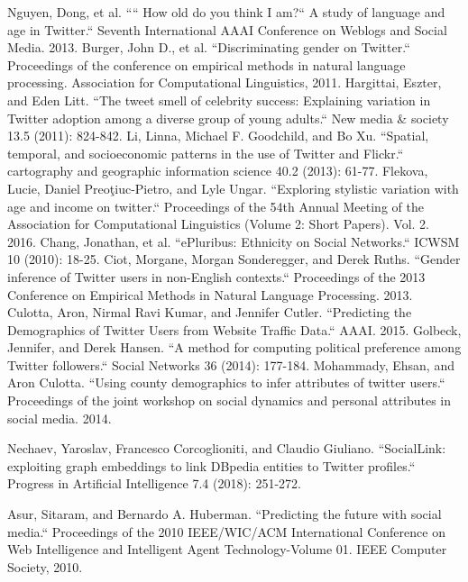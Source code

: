 \begin{thebibliography}{200}
 Nguyen, Dong, et al. ```` How old do you think I am?`` A study of language and age in Twitter.`` Seventh International AAAI Conference on Weblogs and Social Media. 2013.\label{appendix:4.2}
 Burger, John D., et al. ``Discriminating gender on Twitter.`` Proceedings of the conference on empirical methods in natural language processing. Association for Computational Linguistics, 2011.\label{appendix:4.3}
 Hargittai, Eszter, and Eden Litt. ``The tweet smell of celebrity success: Explaining variation in Twitter adoption among a diverse group of young adults.`` New media \& society 13.5 (2011): 824-842.\label{appendix:4.4}
 Li, Linna, Michael F. Goodchild, and Bo Xu. ``Spatial, temporal, and socioeconomic patterns in the use of Twitter and Flickr.`` cartography and geographic information science 40.2 (2013): 61-77.\label{appendix:4.5}
 Flekova, Lucie, Daniel Preoţiuc-Pietro, and Lyle Ungar. ``Exploring stylistic variation with age and income on twitter.`` Proceedings of the 54th Annual Meeting of the Association for Computational Linguistics (Volume 2: Short Papers). Vol. 2. 2016.\label{appendix:4.6}
 Chang, Jonathan, et al. ``ePluribus: Ethnicity on Social Networks.`` ICWSM 10 (2010): 18-25.\label{appendix:4.7}
 Ciot, Morgane, Morgan Sonderegger, and Derek Ruths. ``Gender inference of Twitter users in non-English contexts.`` Proceedings of the 2013 Conference on Empirical Methods in Natural Language Processing. 2013.\label{appendix:4.8}
 Culotta, Aron, Nirmal Ravi Kumar, and Jennifer Cutler. ``Predicting the Demographics of Twitter Users from Website Traffic Data.`` AAAI. 2015.\label{appendix:4.9}
 Golbeck, Jennifer, and Derek Hansen. ``A method for computing political preference among Twitter followers.`` Social Networks 36 (2014): 177-184.\label{appendix:4.10}
 Mohammady, Ehsan, and Aron Culotta. ``Using county demographics to infer attributes of twitter users.`` Proceedings of the joint workshop on social dynamics and personal attributes in social media. 2014.\label{appendix:4.12}

 Nechaev, Yaroslav, Francesco Corcoglioniti, and Claudio Giuliano. ``SocialLink: exploiting graph embeddings to link DBpedia entities to Twitter profiles.`` Progress in Artificial Intelligence 7.4 (2018): 251-272.\label{appendix:4.15}

\iffalse
{} Asur, Sitaram, and Bernardo A. Huberman. ``Predicting the future with social media.`` Proceedings of the 2010 IEEE/WIC/ACM International Conference on Web Intelligence and Intelligent Agent Technology-Volume 01. IEEE Computer Society, 2010.\label{appendix:4.16}


\end{thebibliography}
